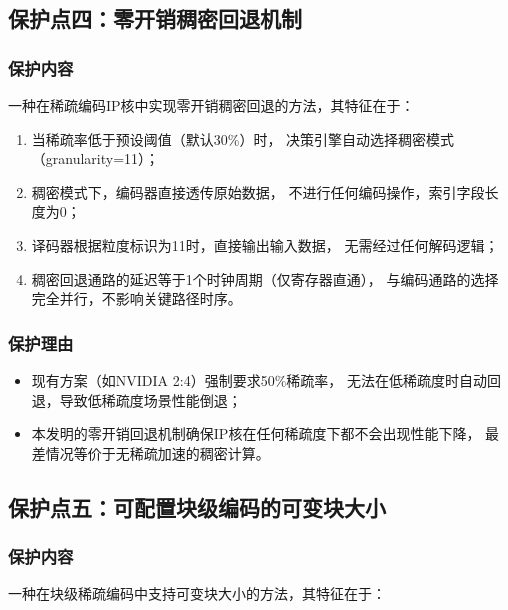 \documentclass[a4paper,12pt,fontset=ubuntu]{ctexart}
\begin{document}
\subsection{保护点四：零开销稠密回退机制}

\subsubsection{保护内容}

一种在稀疏编码IP核中实现零开销稠密回退的方法，其特征在于：

\begin{enumerate}
  \item 当稀疏率低于预设阈值（默认30\%）时，
        决策引擎自动选择稠密模式（granularity=11）；

  \item 稠密模式下，编码器直接透传原始数据，
        不进行任何编码操作，索引字段长度为0；

  \item 译码器根据粒度标识为11时，直接输出输入数据，
        无需经过任何解码逻辑；

  \item 稠密回退通路的延迟等于1个时钟周期（仅寄存器直通），
        与编码通路的选择完全并行，不影响关键路径时序。
\end{enumerate}

\subsubsection{保护理由}

\begin{itemize}
  \item 现有方案（如NVIDIA 2:4）强制要求50\%稀疏率，
        无法在低稀疏度时自动回退，导致低稀疏度场景性能倒退；
  \item 本发明的零开销回退机制确保IP核在任何稀疏度下都不会出现性能下降，
        最差情况等价于无稀疏加速的稠密计算。
\end{itemize}

\subsection{保护点五：可配置块级编码的可变块大小}

\subsubsection{保护内容}

一种在块级稀疏编码中支持可变块大小的方法，其特征在于：
\end{document}
